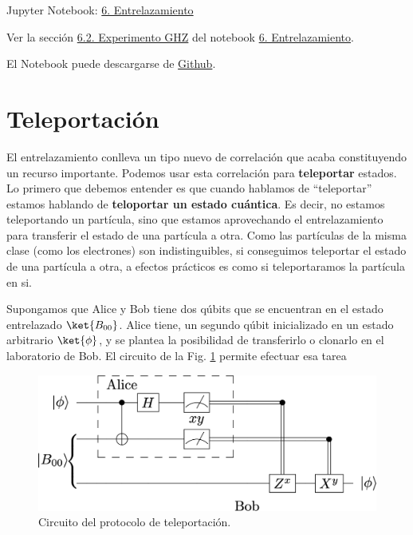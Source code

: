\documentclass[a4paper,11pt]{book} %
\numberwithin{equation}{chapter}
\begin{document}
	\begin{mybox_orange}{Jupyter Notebook: \href{https://www.scbi.uma.es/web/wp-content/uploads/Jupyterbook/CICC_UMA/Notebooks/html/docs/Part_01/Chapter_06-Entrelazamiento_myst.html}{6. Entrelazamiento}}
	
	Ver la sección \href{https://www.scbi.uma.es/web/wp-content/uploads/Jupyterbook/CICC_UMA/Notebooks/html/docs/Part_01/Chapter_06-Entrelazamiento_myst.html#experimento-ghz}{6.2. Experimento GHZ} del notebook \href{https://www.scbi.uma.es/web/wp-content/uploads/Jupyterbook/CICC_UMA/Notebooks/html/docs/Part_01/Chapter_06-Entrelazamiento_myst.html}{6. Entrelazamiento}.
	
	El Notebook puede descargarse de \href{https://github.com/davidcb98/CICC_UMA/blob/master/Notebooks/Part_01/Chapter_06-Entrelazamiento.ipynb}{Github}.
	\end{mybox_orange}


    \section{Teleportación}



El entrelazamiento conlleva un tipo  nuevo de correlación que acaba constituyendo un recurso importante.  Podemos usar esta correlación para \textbf{teleportar} estados. Lo primero que debemos entender es que cuando hablamos de ``teleportar'' estamos hablando de \textbf{teloportar un estado cuántica}. Es decir, no estamos teleportando un partícula, sino que estamos aprovechando el entrelazamiento para transferir el estado de una partícula a otra. Como las partículas de la misma clase (como los electrones) son indistinguibles, si conseguimos teleportar  el estado de una partícula a otra, a efectos prácticos es como si teleportaramos la partícula en si. 

       
Supongamos que Alice y Bob tiene dos qúbits que se encuentran en el estado entrelazado $\ket{B_{00}}$.  Alice tiene, un segundo qúbit inicializado en un estado arbitrario $\ket{\phi}$, y se plantea la posibilidad de transferirlo o clonarlo en el laboratorio de Bob. El circuito de la Fig. \ref{Fig_entrelazamiento_teleportacion} permite efectuar esa tarea

	\begin{figure}[H]
	\centering 
	\includegraphics[width=0.45\linewidth]{Figuras/Fig_entrelazamiento_teleportacion.png}
	\caption{Circuito del protocolo de teleportación.}
	\label{Fig_entrelazamiento_teleportacion}
	\end{figure}
\end{document}
